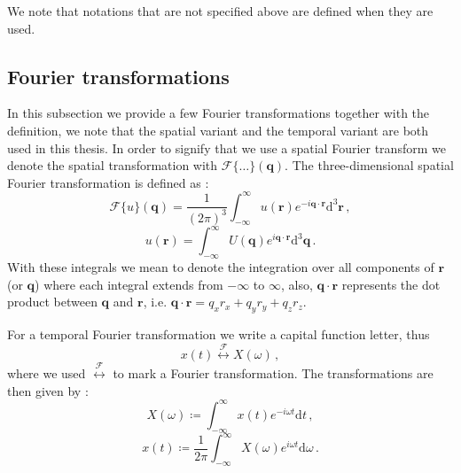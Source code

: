 We note that notations that are not specified above are defined when they are used.

\subsection*{Fourier transformations}
In this subsection we provide a few Fourier transformations together with the definition, we note that the spatial variant and the temporal variant are both used in this thesis.
In order to signify that we use a spatial Fourier transform we denote the spatial transformation with $\mathcal F \{ \dots \}(\mathbf q)$.
The three-dimensional spatial Fourier transformation is defined as \cite[Section 3.4]{Fourier_transform}:
\begin{equation}
    \mathcal F\{u\}(\mathbf q) = \frac{1}{(2\pi)^3} \int_{-\infty}^{\infty} u(\mathbf r) e^{-i \mathbf q \cdot \mathbf r} \mathrm d^3 \mathbf r \,,\label{eq:fourier_trans}
\end{equation}
\begin{equation}
    u(\mathbf r) = \int_{-\infty}^{\infty} U(\mathbf q) e^{i \mathbf q \cdot \mathbf r} \mathrm d^3 \mathbf q \,.\label{eq:inv_fourier}
\end{equation}
With these integrals we mean to denote the integration over all components of $\mathbf r$ (or $\mathbf q$) where each integral extends from $-\infty$ to $\infty$, also, $\mathbf q \cdot \mathbf r$ represents the dot product between $\mathbf q$ and $\mathbf r$, i.e. $\mathbf q \cdot \mathbf r = q_x r_x + q_y r_y + q_z r_z$.

For a temporal Fourier transformation we write a capital function letter, thus
\begin{equation}
    x(t) \stackrel{\mathcal F}{\longleftrightarrow} X(\omega) \,, \nonumber
\end{equation}
where we used $\stackrel{\mathcal F}{\longleftrightarrow}$ to mark a Fourier transformation.
The transformations are then given by \cite[equations 4.8 \& 4.9]{signals_and_systems}:
\begin{equation}
    X(\omega) \coloneq \int_{-\infty}^{\infty} x(t) e^{-i\omega t} \mathrm d t \,, \label{eq:temporal_fourier_transform}
\end{equation}
\begin{equation}
    x(t) \coloneq \frac{1}{2\pi} \int_{-\infty}^{\infty} X(\omega) e^{i\omega t} \mathrm d \omega \,. \label{eq:reverse_time_fourier}
\end{equation}

